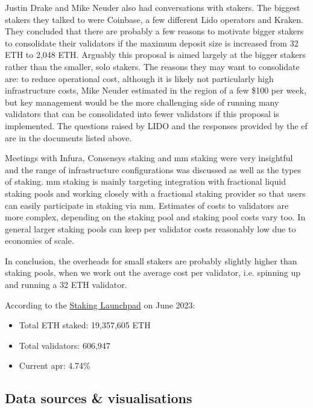 \documentclass[UTF8]{article}
\begin{document}
Justin Drake and Mike Neuder also had conversations with stakers. The biggest stakers they talked to were Coinbase, a few different Lido operators and Kraken. They concluded that there are probably a few reasons to motivate bigger stakers to consolidate their validators if the maximum deposit size is increased from 32 ETH to 2,048 ETH. Arguably this proposal is aimed largely at the bigger stakers rather than the smaller, solo stakers. The reasons they may want to consolidate are: to reduce operational cost, although it is likely not particularly high infrastructure costs, Mike Neuder estimated in the region of a few \$100 per week, but key management would be the more challenging side of running many validators that can be consolidated into fewer validators if this proposal is implemented. The questions raised by LIDO and the responses provided by the \gls{ef} are in the documents listed above.


Meetings with Infura, Consensys staking and  \gls{mm} staking were very insightful and the range of infrastructure configurations was discussed as well as the types of staking. \gls{mm} staking is mainly targeting integration with fractional liquid staking pools and working closely with a fractional staking provider so that users can easily participate in staking via \gls{mm}.
Estimates of costs to validators are more complex, depending on the staking pool and staking pool costs vary too. In general larger staking pools can keep per validator costs reasonably low due to economies of scale.

In conclusion, the overheads for small stakers are probably slightly higher than staking pools, when we work out the average cost per validator, i.e. spinning up and running a 32 ETH validator. 

According to the \href{https://launchpad.ethereum.org/en/}{Staking Launchpad} on June 2023:
\begin{itemize}
\item Total ETH staked: 19,357,605 ETH
\item Total validators: 606,947
\item Current \gls{apr}: 4.74\%
\end{itemize}

\subsection{Data sources \& visualisations}
\label{sec:datastaking}
\end{document}
